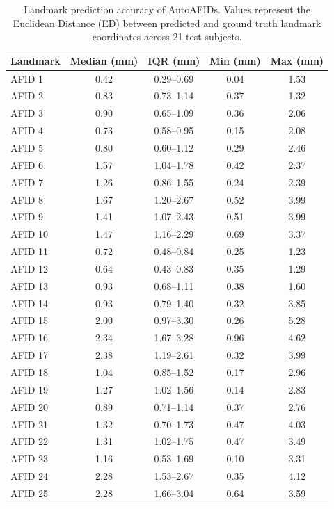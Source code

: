 \begin{table}[H]
\centering
\footnotesize
\caption{Landmark prediction accuracy of AutoAFIDs. Values represent the Euclidean Distance (ED) between predicted and ground truth landmark coordinates across 21 test subjects.} \label{tab:autoafids_accuracy}
\begin{tabular}{lcccc}
\toprule
\textbf{Landmark} & \textbf{Median (mm)} & \textbf{IQR (mm)} & \textbf{Min (mm)} & \textbf{Max (mm)} \\
\midrule
AFID 1 & 0.42 & 0.29--0.69 & 0.04 & 1.53 \\
AFID 2 & 0.83 & 0.73--1.14 & 0.37 & 1.32 \\
AFID 3 & 0.90 & 0.65--1.09 & 0.36 & 2.06 \\
AFID 4 & 0.73 & 0.58--0.95 & 0.15 & 2.08 \\
AFID 5 & 0.80 & 0.60--1.12 & 0.29 & 2.46 \\
AFID 6 & 1.57 & 1.04--1.78 & 0.42 & 2.37 \\
AFID 7 & 1.26 & 0.86--1.55 & 0.24 & 2.39 \\
AFID 8 & 1.67 & 1.20--2.67 & 0.52 & 3.99 \\
AFID 9 & 1.41 & 1.07--2.43 & 0.51 & 3.99 \\
AFID 10 & 1.47 & 1.16--2.29 & 0.69 & 3.37 \\
AFID 11 & 0.72 & 0.48--0.84 & 0.25 & 1.23 \\
AFID 12 & 0.64 & 0.43--0.83 & 0.35 & 1.29 \\
AFID 13 & 0.93 & 0.68--1.11 & 0.38 & 1.60 \\
AFID 14 & 0.93 & 0.79--1.40 & 0.32 & 3.85 \\
AFID 15 & 2.00 & 0.97--3.30 & 0.26 & 5.28 \\
AFID 16 & 2.34 & 1.67--3.28 & 0.96 & 4.62 \\
AFID 17 & 2.38 & 1.19--2.61 & 0.32 & 3.99 \\
AFID 18 & 1.04 & 0.85--1.52 & 0.17 & 2.96 \\
AFID 19 & 1.27 & 1.02--1.56 & 0.14 & 2.83 \\
AFID 20 & 0.89 & 0.71--1.14 & 0.37 & 2.76 \\
AFID 21 & 1.32 & 0.70--1.73 & 0.47 & 4.03 \\
AFID 22 & 1.31 & 1.02--1.75 & 0.47 & 3.49 \\
AFID 23 & 1.16 & 0.53--1.69 & 0.10 & 3.31 \\
AFID 24 & 2.28 & 1.53--2.67 & 0.35 & 4.12 \\
AFID 25 & 2.28 & 1.66--3.04 & 0.64 & 3.59 \\

\end{tabular}
\end{table}
